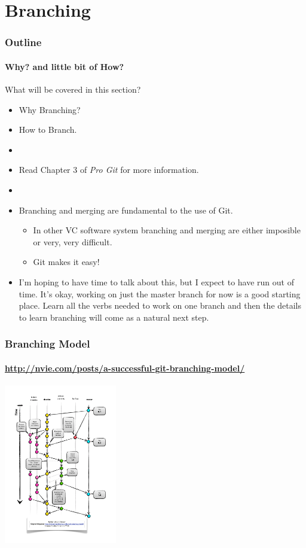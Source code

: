 \section{Branching}

\begin{frame}[t]
  \frametitle{Outline}
  \framesubtitle{Why? and little bit of How?}
\end{frame}

\begin{frame}[t]{What will be covered in this section?}
  \begin{itemize}
    \item Why Branching?
    \item How to Branch.
    \item[]
    \item Read Chapter 3 of {\it Pro Git} for more information.
    \item[]
    \item Branching and merging are fundamental to the use of Git.  
      \begin{itemize}
        \item In other VC software system branching and merging are either
          imposible or very, very difficult.
        \item Git makes it easy!
      \end{itemize}

    \item I'm hoping to have time to talk about this, but I expect to have run
      out of time.  It's okay, working on just the master branch for now is a
      good starting place.  Learn all the verbs needed to work on one branch and
      then the details to learn branching will come as a natural next step.
  \end{itemize}
\end{frame}

\begin{frame}[t]{}
  \frametitle{Branching Model}
  \framesubtitle{ \url{http://nvie.com/posts/a-successful-git-branching-model/} }

  \begin{center} 
    \includegraphics[height=2.75in]{../images/Git-branching-model}
  \end{center}
\end{frame}

